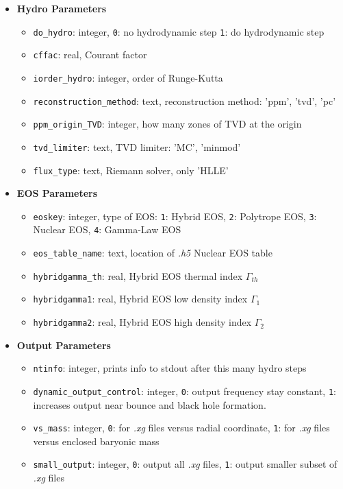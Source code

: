 \documentclass[10pt,nofootinbib]{article}
\newcommand{\code}[1]{\texttt{#1}}
\begin{document}
\begin{itemize}
\begin{itemize}
\end{itemize}
\item{{\bf Hydro Parameters}}
\begin{itemize}
\item{{\tt do\_hydro}: integer, \code{0}: no hydrodynamic step \code{1}: do hydrodynamic step}
\item{{\tt cffac}: real, Courant factor}
\item{{\tt iorder\_hydro}: integer, order of Runge-Kutta}
\item{{\tt reconstruction\_method}: text, reconstruction method: 'ppm', 'tvd', 'pc'}
\item{{\tt ppm\_origin\_TVD}: integer, how many zones of TVD at the origin}
\item{{\tt tvd\_limiter}: text, TVD limiter: 'MC', 'minmod'}
\item{{\tt flux\_type}: text, Riemann solver, only 'HLLE'}
\end{itemize}
\item{{\bf EOS Parameters}}
\begin{itemize}
\item{{\tt eoskey}: integer, type of EOS: \code{1}: Hybrid EOS, \code{2}: Polytrope EOS, \code{3}: Nuclear EOS, \code{4}: Gamma-Law EOS}
\item{{\tt eos\_table\_name}: text, location of {\it .h5} Nuclear EOS table}
\item{{\tt hybridgamma\_th}: real, Hybrid EOS thermal index $\Gamma_{th}$}
\item{{\tt hybridgamma1}: real, Hybrid EOS low density index $\Gamma_{1}$}
\item{{\tt hybridgamma2}: real, Hybrid EOS high density index $\Gamma_{2}$}
\end{itemize}
\item{{\bf Output Parameters}}
\begin{itemize}
\item{{\tt ntinfo}: integer, prints info to stdout after this many hydro steps}
\item{{\tt dynamic\_output\_control}: integer, \code{0}: output frequency stay constant, \code{1}: increases output near bounce and black hole formation}.
\item{{\tt vs\_mass}: integer, \code{0}: for {\it .xg} files versus radial coordinate, \code{1}: for {\it .xg} files versus enclosed baryonic mass}
\item{{\tt small\_output}: integer, \code{0}: output all {\it .xg} files, \code{1}: output smaller subset of {\it .xg} files}

\end{itemize}
\end{itemize}
\end{document}
